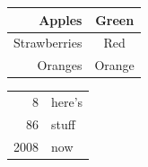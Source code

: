 \documentclass[a4paper,12pt]{article}
\begin{document}
    \begin{tabular}{rc}
    Apples & Green\\
    \hline 
    Strawberries & Red \\
    \cline{1-1}
    Oranges & Orange \\
    \end{tabular}
    
    \begin{tabular}{|r|l|}
    \hline
    8 & here's \\
    \cline{2-2}
    86 & stuff\\
    \hline \hline 
    2008 & now \\
    \hline 
    \end{tabular}
\end{document}
